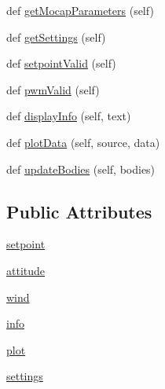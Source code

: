 \begin{DoxyCompactItemize}
\item 
def \mbox{\hyperlink{classwindshape_1_1gui_1_1widgets_1_1_control_panel_1_1_control_panel_af95a44aff623ad5561736e1402c44f9c}{get\+Mocap\+Parameters}} (self)
\item 
def \mbox{\hyperlink{classwindshape_1_1gui_1_1widgets_1_1_control_panel_1_1_control_panel_acae55dbd8f1a458739fb1a07f92be489}{get\+Settings}} (self)
\item 
def \mbox{\hyperlink{classwindshape_1_1gui_1_1widgets_1_1_control_panel_1_1_control_panel_a7213d7b8533c2b27a86b8b2b91de2d05}{setpoint\+Valid}} (self)
\item 
def \mbox{\hyperlink{classwindshape_1_1gui_1_1widgets_1_1_control_panel_1_1_control_panel_a8bf19a6c725a2a2221d5ce03db5c4d23}{pwm\+Valid}} (self)
\item 
def \mbox{\hyperlink{classwindshape_1_1gui_1_1widgets_1_1_control_panel_1_1_control_panel_a992479abb297e7594068cf31376f2893}{display\+Info}} (self, text)
\item 
def \mbox{\hyperlink{classwindshape_1_1gui_1_1widgets_1_1_control_panel_1_1_control_panel_a0d8376b49b32e80c2415f21fc551959a}{plot\+Data}} (self, source, data)
\item 
def \mbox{\hyperlink{classwindshape_1_1gui_1_1widgets_1_1_control_panel_1_1_control_panel_a0b74858744235c75e82c691d031fcdc1}{update\+Bodies}} (self, bodies)
\end{DoxyCompactItemize}
\subsection*{Public Attributes}
\begin{DoxyCompactItemize}
\item 
\mbox{\hyperlink{classwindshape_1_1gui_1_1widgets_1_1_control_panel_1_1_control_panel_a8ccf476714abf33647c9f96de9bcb195}{setpoint}}
\item 
\mbox{\hyperlink{classwindshape_1_1gui_1_1widgets_1_1_control_panel_1_1_control_panel_a6aca1b7aed26aaf94ed1a8fa05256512}{attitude}}
\item 
\mbox{\hyperlink{classwindshape_1_1gui_1_1widgets_1_1_control_panel_1_1_control_panel_a4f60583cb4426f8d0de0ce906d18720e}{wind}}
\item 
\mbox{\hyperlink{classwindshape_1_1gui_1_1widgets_1_1_control_panel_1_1_control_panel_ac6c099bf1e755523f6895b843126cf6f}{info}}
\item 
\mbox{\hyperlink{classwindshape_1_1gui_1_1widgets_1_1_control_panel_1_1_control_panel_a41ae54c56858cfc0bbf8b8a27a554a40}{plot}}
\item 
\mbox{\hyperlink{classwindshape_1_1gui_1_1widgets_1_1_control_panel_1_1_control_panel_abc7ac63c8f710140e0b5d61045ecc75c}{settings}}
\end{DoxyCompactItemize}


